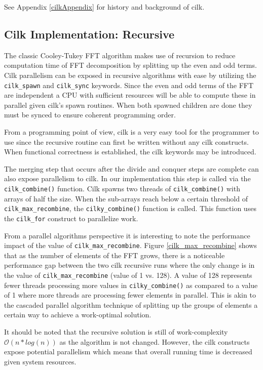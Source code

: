
See Appendix \ref{cilkAppendix} for history and background of cilk.

\subsection{Cilk Implementation: Recursive}

The classic Cooley-Tukey FFT algorithm makes use of recursion to reduce computation time of FFT decomposition by splitting up the even and odd terms. Cilk parallelism can be exposed in recursive algorithms with ease by utilizing the \texttt{cilk\_spawn} and \texttt{cilk\_sync} keywords. Since the even and odd terms of the FFT are independent a CPU with sufficient resources will be able to compute these in parallel given cilk’s spawn routines. When both spawned children are done they must be synced to ensure coherent programming order.

From a programming point of view, cilk is a very easy tool for the programmer to use since the recursive routine can first be written without any cilk constructs. When functional correctness is established, the cilk keywords may be introduced.

The merging step that occurs after the divide and conquer steps are complete can also expose parallelism to cilk. In our implementation this step is called via the \texttt{cilk\_combine()} function. Cilk spawns two threads of \texttt{cilk\_combine()} with arrays of half the size. When the sub-arrays reach below a certain threshold of \texttt{cilk\_max\_recombine}, the \texttt{cilky\_combine()} function is called. This function uses the \texttt{cilk\_for} construct to parallelize work.

From a parallel algorithms perspective it is interesting to note the performance impact of the value of \texttt{cilk\_max\_recombine}. Figure \ref{cilk_max_recombine} shows that as the number of elements of the FFT grows, there is a noticeable performance gap between the two cilk recursive runs where the only change is in the value of \texttt{cilk\_max\_recombine} (value of 1 vs. 128). A value of 128 represents fewer threads processing more values in \texttt{cilky\_combine()} as compared to a value of 1 where more threads are processing fewer elements in parallel. This is akin to the cascaded parallel algorithm technique of splitting up the groups of elements a certain way to achieve a work-optimal solution. 

It should be noted that the recursive solution is still of work-complexity $\mathcal{O}(n * log(n))$ as the algorithm is not changed. However, the cilk constructs expose potential parallelism which means that overall running time is decreased given system resources. 



